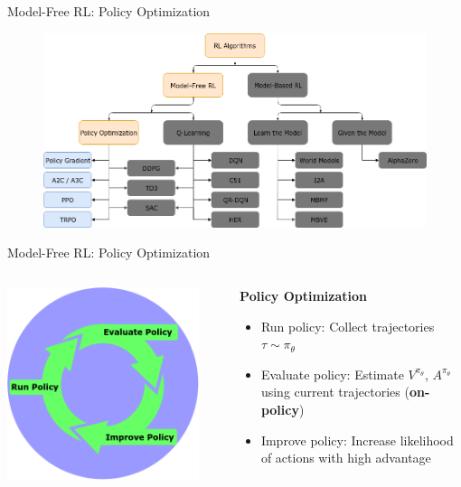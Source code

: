 \documentclass[9pt]{beamer}
\begin{document}
\begin{frame}{Model-Free RL: Policy Optimization}
\begin{figure}
\centering
\includegraphics[width=\linewidth]{rl_algorithms_polopt_only}
\end{figure}
\end{frame}

\begin{frame}{Model-Free RL: Policy Optimization}


\begin{columns}
\begin{column}{0.33\textwidth}
\includegraphics[width=0.9\textwidth]{rl_loop}
\end{column}
\begin{column}{0.67\textwidth}
\textbf{Policy Optimization}
\begin{itemize}
\item Run policy: Collect trajectories $\tau \sim \pi_{\theta}$
\item Evaluate policy: Estimate $V^{\pi_{\theta}}$, $A^{\pi_{\theta}}$ using current trajectories (\textbf{on-policy})
\item Improve policy: Increase likelihood of actions with high advantage
\end{itemize}
\end{column}
\end{columns}
\end{frame}
\end{document}
